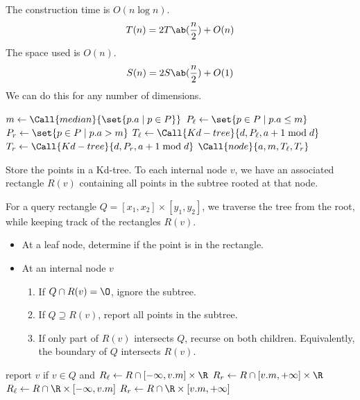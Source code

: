The construction time is $O(n \log n)$. \[
    T(n) = 2T\ab(\frac{n}{2}) + O(n)
\] The space used is $O(n)$. \[
    S(n) = 2S\ab(\frac{n}{2}) + O(1)
\]
We can do this for any number of dimensions.
\begin{algo}
        \State $m \gets \Call{median}{\set{p.a \mid p \in P}}$
        \State $P_\ell \gets \set{p \in P \mid p.a \le m}$
        \State $P_r \gets \set{p \in P \mid p.a > m}$
        \State $T_\ell \gets \Call{Kd-tree}{d, P_\ell, a + 1 \bmod d}$
        \State $T_r \gets \Call{Kd-tree}{d, P_r, a + 1 \bmod d}$
        \State \Return $\Call{node}{a, m, T_\ell, T_r}$
    \EndFn
\end{algo}
\begin{solution} \label{sol:kd}
    Store the points in a Kd-tree.
    To each internal node $v$, we have an associated rectangle $R(v)$
    containing all points in the subtree rooted at that node.

    For a query rectangle $Q = [x_1, x_2] \times [y_1, y_2]$,
    we traverse the tree from the root, while keeping track of the
    rectangles $R(v)$.
    \begin{itemize}
        \item At a leaf node, determine if the point is in the rectangle.
        \item At an internal node $v$
        \begin{enumerate}
            \item \label{sol:kd:ignore}
                If $Q \cap R(v) = \O$, ignore the subtree.
            \item \label{sol:kd:report}
                If $Q \supseteq R(v)$, report all points in the subtree.
            \item \label{sol:kd:recurse}
                If only part of $R(v)$ intersects $Q$,
                recurse on both children.
                Equivalently, the boundary of $Q$ intersects $R(v)$.
        \end{enumerate}
    \end{itemize}
    \begin{algo}
                \State report $v$ if $v \in Q$ and \Return
            \EndIf
                \State \Return
            \EndIf
                \State $R_\ell \gets R \cap [-\infty, v.m] \times \R$
                \State $R_r \gets R \cap [v.m, +\infty] \times \R$
            \Else
                \State $R_\ell \gets R \cap \R \times [-\infty, v.m]$
                \State $R_r \gets R \cap \R \times [v.m, +\infty]$
            \EndIf
            \State {}
            \State {}
        \EndFn
    \end{algo}
\end{solution}
